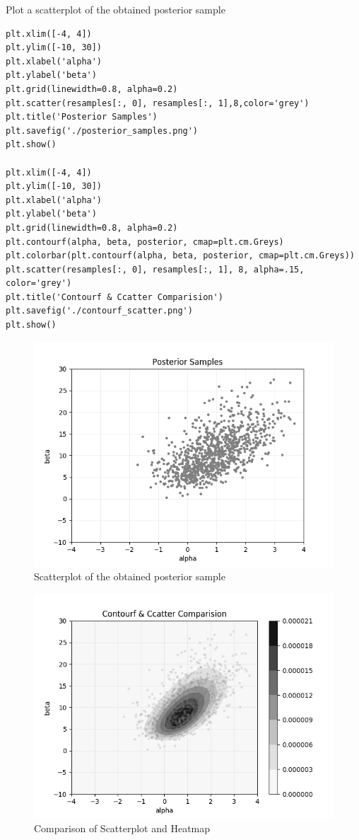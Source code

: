 \documentclass{article}
\begin{document}
Plot a scatterplot of the obtained posterior sample
\begin{verbatim}
plt.xlim([-4, 4])
plt.ylim([-10, 30])
plt.xlabel('alpha')
plt.ylabel('beta')
plt.grid(linewidth=0.8, alpha=0.2)
plt.scatter(resamples[:, 0], resamples[:, 1],8,color='grey')
plt.title('Posterior Samples')
plt.savefig('./posterior_samples.png')
plt.show()

plt.xlim([-4, 4])
plt.ylim([-10, 30])
plt.xlabel('alpha')
plt.ylabel('beta')
plt.grid(linewidth=0.8, alpha=0.2)
plt.contourf(alpha, beta, posterior, cmap=plt.cm.Greys)
plt.colorbar(plt.contourf(alpha, beta, posterior, cmap=plt.cm.Greys))
plt.scatter(resamples[:, 0], resamples[:, 1], 8, alpha=.15, color='grey')
plt.title('Contourf & Ccatter Comparision')
plt.savefig('./contourf_scatter.png')
plt.show()
\end{verbatim}
 
\begin{figure}[H]
\centering  
\includegraphics[scale=0.6]{posterior_samples.png}
\caption{Scatterplot of the obtained posterior sample}
\label{fig: label}
\end{figure}

\begin{figure}[H]
\centering  
\includegraphics[scale=0.6]{contourf_scatter.png}
\caption{Comparison of Scatterplot and Heatmap }
\label{fig: label}
\end{figure}
 
\end{document}
